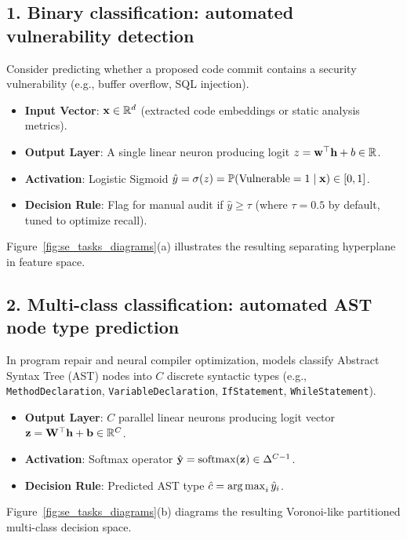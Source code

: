 \documentclass[../../main.tex]{subfiles}
\begin{document}
\subsection{1. Binary classification: automated vulnerability detection}
Consider predicting whether a proposed code commit contains a security vulnerability (e.g., buffer overflow, SQL injection).
\begin{itemize}
    \item \textbf{Input Vector}: $\mathbf{x} \in \mathbb{R}^{d}$ (extracted code embeddings or static analysis metrics).
    \item \textbf{Output Layer}: A single linear neuron producing logit $z = \mathbf{w}^\top \mathbf{h} + b \in \mathbb{R}$.
    \item \textbf{Activation}: Logistic Sigmoid $\hat{y} = \sigma(z) = \mathbb{P}(\text{Vulnerable} = 1 \mid \mathbf{x}) \in [0, 1]$.
    \item \textbf{Decision Rule}: Flag for manual audit if $\hat{y} \ge \tau$ (where $\tau = 0.5$ by default, tuned to optimize recall).
\end{itemize}
Figure~\ref{fig:se_tasks_diagrams}(a) illustrates the resulting separating hyperplane in feature space.

\subsection{2. Multi-class classification: automated AST node type prediction}
In program repair and neural compiler optimization, models classify Abstract Syntax Tree (AST) nodes into $C$ discrete syntactic types (e.g., \texttt{MethodDeclaration}, \texttt{VariableDeclaration}, \texttt{IfStatement}, \texttt{WhileStatement}).
\begin{itemize}
    \item \textbf{Output Layer}: $C$ parallel linear neurons producing logit vector $\mathbf{z} = \mathbf{W}^\top \mathbf{h} + \mathbf{b} \in \mathbb{R}^C$.
    \item \textbf{Activation}: Softmax operator $\hat{\mathbf{y}} = \operatorname{\mathrm{softmax}}(\mathbf{z}) \in \Delta^{C-1}$.
    \item \textbf{Decision Rule}: Predicted AST type $\hat{c} = \operatorname*{\mathrm{arg\,max}}_{i} \hat{y}_i$.
\end{itemize}
Figure~\ref{fig:se_tasks_diagrams}(b) diagrams the resulting Voronoi-like partitioned multi-class decision space.
\end{document}
